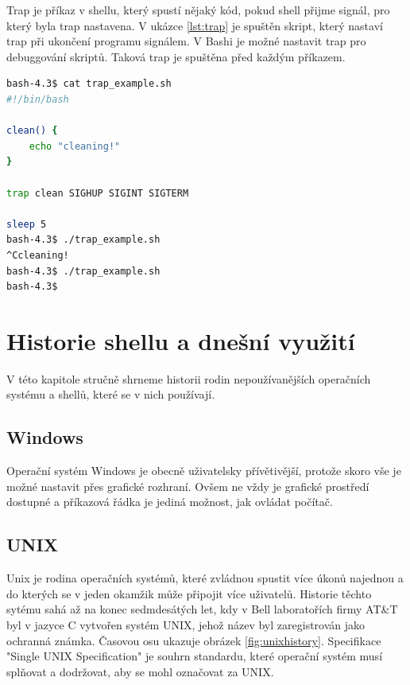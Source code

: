 \documentclass[thesis=M,czech]{FITthesis}[2012/06/26]
\begin{document}

Trap je příkaz v shellu, který spustí nějaký kód, pokud shell přijme signál, pro který byla trap nastavena. V ukázce \ref{lst:trap} je spuštěn skript, který nastaví trap při ukončení programu signálem. V Bashi je možné nastavit trap pro debuggování skriptů. Taková trap je spuštěna před každým příkazem.

\begin{minipage}{\linewidth}
\begin{lstlisting}[language=bash, caption={Ukázka trap v shellu Bash}, label={lst:trap}]
bash-4.3$ cat trap_example.sh 
#!/bin/bash

clean() {
	echo "cleaning!"
}

trap clean SIGHUP SIGINT SIGTERM

sleep 5
bash-4.3$ ./trap_example.sh 
^Ccleaning!
bash-4.3$ ./trap_example.sh 
bash-4.3$ 
\end{lstlisting}
\end{minipage}

%
\chapter{Historie shellu a dnešní využití}

V této kapitole stručně shrneme historii rodin nepoužívanějších operačních systému a shellů, které se v nich používají. 


%
\section{Windows}

Operační systém Windows je obecně uživatelsky přívětivější, protože skoro vše je možné nastavit přes grafické rozhraní. Ovšem ne vždy je grafické prostředí dostupné a příkazová řádka je jediná možnost, jak ovládat počítač.


\section{UNIX}

Unix je rodina operačních systémů, které zvládnou spustit více úkonů najednou a do kterých se v jeden okamžik může připojit více uživatelů. Historie těchto sytému sahá až na konec sedmdesátých let, kdy v Bell laboratořích firmy AT\&T byl v jazyce C vytvořen systém UNIX, jehož název byl zaregistrován jako ochranná známka. Časovou osu ukazuje obrázek \ref{fig:unixhistory}. Specifikace "Single UNIX Specification" je souhrn standardu, které operační systém musí splňovat a dodržovat, aby se mohl označovat za UNIX.
\end{document}
